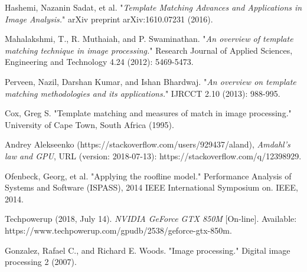 \cleardoublepage
{}
{}
\begin{thebibliography}{99}
	
	Hashemi, Nazanin Sadat, et al. "\textit{Template Matching Advances and Applications in Image Analysis.}" arXiv preprint arXiv:1610.07231 (2016).
	
	
	Mahalakshmi, T., R. Muthaiah, and P. Swaminathan. "\textit{An overview of template matching technique in image processing.}" Research Journal of Applied Sciences, Engineering and Technology 4.24 (2012): 5469-5473.
	
	Perveen, Nazil, Darshan Kumar, and Ishan Bhardwaj. "\textit{An overview on template matching methodologies and its applications.}" IJRCCT 2.10 (2013): 988-995.
	
	Cox, Greg S. "Template matching and measures of match in image processing." University of Cape Town, South Africa (1995).
	
	Andrey Alekseenko (https://stackoverflow.com/users/929437/aland), \textit{Amdahl's law and GPU}, URL (version: 2018-07-13): https://stackoverflow.com/q/12398929.
	
	Ofenbeck, Georg, et al. "Applying the roofline model." Performance Analysis of Systems and Software (ISPASS), 2014 IEEE International Symposium on. IEEE, 2014.
	
	Techpowerup (2018, July 14). \textit{NVIDIA GeForce GTX 850M} [On-line]. Available: https://www.techpowerup.com/gpudb/2538/geforce-gtx-850m.
	
	Gonzalez, Rafael C., and Richard E. Woods. "Image processing." Digital image processing 2 (2007).
\end{thebibliography}